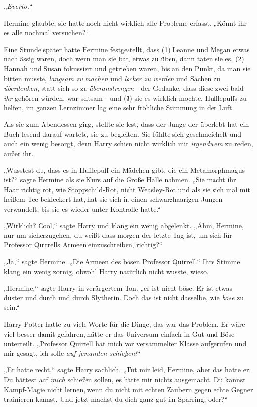 {„\emph{Everto.}“

Hermine glaubte, sie hatte noch nicht wirklich alle Probleme erfasst. „Könnt ihr es alle nochmal versuchen?“

Eine Stunde später hatte Hermine festgestellt, dass (1) Leanne und Megan etwas nachlässig waren, doch wenn man sie bat, etwas zu üben, dann taten sie es, (2) Hannah und Susan fokussiert und getrieben waren, bis an den Punkt, da man sie bitten musste, \emph{langsam zu machen} und \emph{locker zu werden} und Sachen zu \emph{überdenken}, statt sich so zu \emph{überanstrengen}—der Gedanke, dass diese zwei bald \emph{ihr} gehören würden, war seltsam - und (3) sie es wirklich mochte, Hufflepuffs zu helfen, im ganzen Lernzimmer lag eine sehr fröhliche Stimmung in der Luft.

Als sie zum Abendessen ging, stellte sie fest, dass der Junge-der-überlebt-hat ein Buch lesend darauf wartete, sie zu begleiten. Sie fühlte sich geschmeichelt und auch ein wenig besorgt, denn Harry schien nicht wirklich mit \emph{irgendwem} zu reden, außer ihr.

„Wusstest du, dass es in Hufflepuff ein Mädchen gibt, die ein Metamorphmagus ist?“ sagte Hermine als sie Kurs auf die Große Halle nahmen. „Sie macht ihr Haar richtig rot, wie Stoppschild-Rot, nicht Weasley-Rot und als sie sich mal mit heißem Tee bekleckert hat, hat sie sich in einen schwarzhaarigen Jungen verwandelt, bis sie es wieder unter Kontrolle hatte.“

„Wirklich? Cool,“ sagte Harry und klang ein wenig abgelenkt. „Ähm, Hermine, nur um sicherzugehen, du weißt dass morgen der letzte Tag ist, um sich für Professor Quirrells Armeen einzuschreiben, richtig?“

„Ja,“ sagte Hermine. „Die Armeen des bösen Professor Quirrell.“ Ihre Stimme klang ein wenig zornig, obwohl Harry natürlich nicht wusste, wieso.

„Hermine,“ sagte Harry in verärgertem Ton, „er ist nicht böse. Er ist etwas düster und durch und durch Slytherin. Doch das ist nicht dasselbe, wie \emph{böse} zu sein.“

Harry Potter hatte zu viele Worte für die Dinge, das war das Problem. Er wäre viel besser damit gefahren, hätte er das Universum einfach in Gut und Böse unterteilt. „Professor Quirrell hat mich vor versammelter Klasse aufgerufen und mir gesagt, ich solle \emph{auf jemanden schießen!}“

„Er hatte recht,“ sagte Harry sachlich. „Tut mir leid, Hermine, aber das hatte er. Du hättest auf \emph{mich} schießen sollen, es hätte mir nichts ausgemacht. Du kannst Kampf-Magie nicht lernen, wenn du nicht mit echten Zaubern gegen echte Gegner trainieren kannst. Und jetzt machst du dich ganz gut im Sparring, oder?“

}
